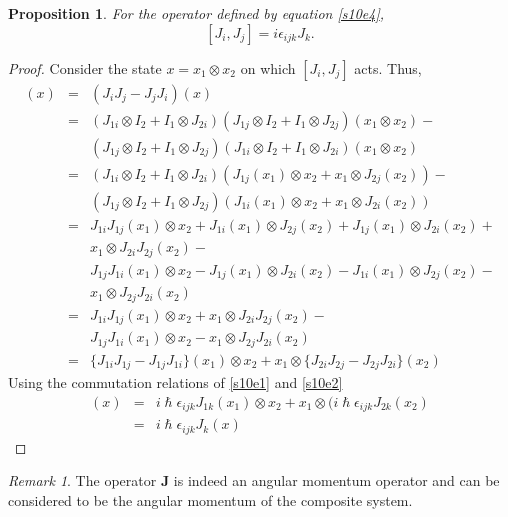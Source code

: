 \documentclass{article}
\numberwithin{equation}{section}
\let\vec\bm
\theoremstyle{plain}
\numberwithin{thm}{section}
\theoremstyle{plain}
\newtheorem{prop}{Proposition}
\numberwithin{prop}{section}
\theoremstyle{definition}
\numberwithin{defn}{section}
\theoremstyle{remark}
\newtheorem*{rem}{Remark}
\begin{document}
\begin{prop}\label{s10p1}
For the operator defined by equation \eqref{s10e4},
\begin{equation}\label{s10e5}
[J_i, J_j] = i\epsilon_{ijk}J_k.
\end{equation}
\end{prop}
\begin{proof}
Consider the state $x = x_1 \otimes x_2$ on which $[J_i, J_j]$ acts. Thus,
\begin{eqnarray*}
[J_i, J_j](x) &=& (J_iJ_j - J_jJ_i)(x) \\
 &=&(J_{1i}\otimes I_2+I_1\otimes J_{2i})(J_{1j}\otimes I_2+I_1\otimes J_{2j})
(x_1 \otimes x_2) - \\
 & &(J_{1j}\otimes I_2+I_1\otimes J_{2j})(J_{1i}\otimes I_2+I_1\otimes J_{2i}) 
(x_1 \otimes x_2) \\
 &=&(J_{1i}\otimes I_2+I_1\otimes J_{2i})(J_{1j}(x_1)\otimes x_2 + x_1 \otimes
J_{2j}(x_2)) - \\
 & &(J_{1j}\otimes I_2+I_1\otimes J_{2j})(J_{1i}(x_1)\otimes x_2 + x_1 \otimes
J_{2i}(x_2)) \\
 &=& J_{1i}J_{1j}(x_1) \otimes x_2+J_{1i}(x_1)\otimes J_{2j}(x_2)+J_{1j}(x_1)
\otimes J_{2i}(x_2) + \\
 & & x_1 \otimes J_{2i}J_{2j}(x_2) - \\
 & & J_{1j}J_{1i}(x_1) \otimes x_2-J_{1j}(x_1)\otimes J_{2i}(x_2)-J_{1i}(x_1)
\otimes J_{2j}(x_2) - \\
 & & x_1 \otimes J_{2j}J_{2i}(x_2)  \\
 &=& J_{1i}J_{1j}(x_1) \otimes x_2 + x_1 \otimes J_{2i}J_{2j}(x_2) - \\
 & & J_{1j}J_{1i}(x_1) \otimes x_2 - x_1 \otimes J_{2j}J_{2i}(x_2) \\
 &=& \{J_{1i}J_{1j} - J_{1j}J_{1i}\}(x_1) \otimes x_2 + 
x_1 \otimes \{J_{2i}J_{2j} - J_{2j}J_{2i}\}(x_2)
\end{eqnarray*}
Using the commutation relations of \eqref{s10e1} and \eqref{s10e2}
\begin{eqnarray*}
[J_i, J_j](x) &=& i\hslash\epsilon_{ijk}J_{1k}(x_1)\otimes x_2 + 
x_1 \otimes (i\hslash\epsilon_{ijk}J_{2k}(x_2) \\
 &=& i\hslash\epsilon_{ijk}J_k(x)
\end{eqnarray*}
\end{proof}

\begin{rem}
The operator $\vec{J}$ is indeed an angular momentum operator and can be
considered to be the angular momentum of the composite system.
\end{rem}
\end{document}
